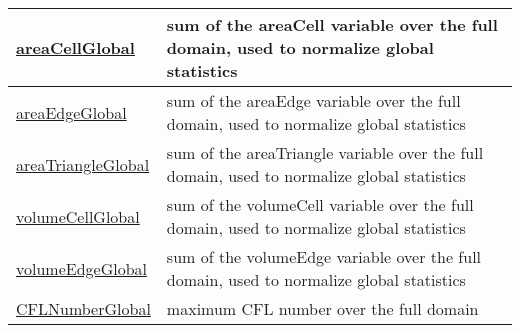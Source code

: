 {\begin{center}
\begin{longtable}{| p{2.0in} | p{4.0in} |}
	\hline
	\hyperref[subsec:var_sec_diagnostics_areaCellGlobal]{areaCellGlobal} & sum of the areaCell variable over the full domain, used to normalize global statistics \\
	\hline
	\hyperref[subsec:var_sec_diagnostics_areaEdgeGlobal]{areaEdgeGlobal} & sum of the areaEdge variable over the full domain, used to normalize global statistics \\
	\hline
	\hyperref[subsec:var_sec_diagnostics_areaTriangleGlobal]{areaTriangleGlobal} & sum of the areaTriangle variable over the full domain, used to normalize global statistics \\
	\hline
	\hyperref[subsec:var_sec_diagnostics_volumeCellGlobal]{volumeCellGlobal} & sum of the volumeCell variable over the full domain, used to normalize global statistics \\
	\hline
	\hyperref[subsec:var_sec_diagnostics_volumeEdgeGlobal]{volumeEdgeGlobal} & sum of the volumeEdge variable over the full domain, used to normalize global statistics \\
	\hline
	\hyperref[subsec:var_sec_diagnostics_CFLNumberGlobal]{CFLNumberGlobal} & maximum CFL number over the full domain \\
	\hline
\end{longtable}
\end{center}
}
